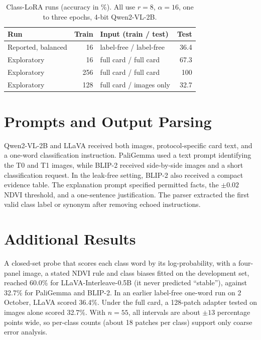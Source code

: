 \documentclass[11pt]{article}
\begin{document}
\begin{table}[h]
\centering
\small
\begin{tabularx}{\columnwidth}{lrXr}
\toprule
Run & Train & Input (train / test) & Test \\
\midrule
Reported, balanced & 16 & label-free / label-free & 36.4 \\
Exploratory & 16 & full card / full card & 67.3 \\
Exploratory & 256 & full card / full card & 100 \\
Exploratory & 128 & full card / images only & 32.7 \\
\bottomrule
\end{tabularx}
\caption{Class-LoRA runs (accuracy in \%). All use $r=8$, $\alpha=16$,
one to three epochs, 4-bit Qwen2-VL-2B.}
\label{tab:ftjobs}
\end{table}

\section{Prompts and Output Parsing}
Qwen2-VL-2B and LLaVA received both images, protocol-specific card text, and a one-word classification instruction. 
PaliGemma used a text prompt identifying the T0 and T1 images, while BLIP-2 received side-by-side images and a short classification request. 
In the leak-free setting, BLIP-2 also received a compact evidence table. The explanation prompt specified permitted facts, the $\pm 0.02$ NDVI threshold, and a one-sentence justification. 
The parser extracted the first valid class label or synonym after removing echoed instructions.

\section{Additional Results}
\label{app:results}

A closed-set probe that scores each class word by its log-probability,
with a four-panel image, a stated NDVI rule and class biases fitted on
the development set, reached 60.0\% for LLaVA-Interleave-0.5B (it never
predicted ``stable''), against 32.7\% for PaliGemma and BLIP-2. In an
earlier label-free one-word run on 2 October, LLaVA scored 36.4\%. Under
the full card, a 128-patch adapter tested on images alone scored 32.7\%.
With $n=55$, all intervals are about $\pm13$ percentage points wide, so
per-class counts (about 18 patches per class) support only coarse error
analysis.
\end{document}

